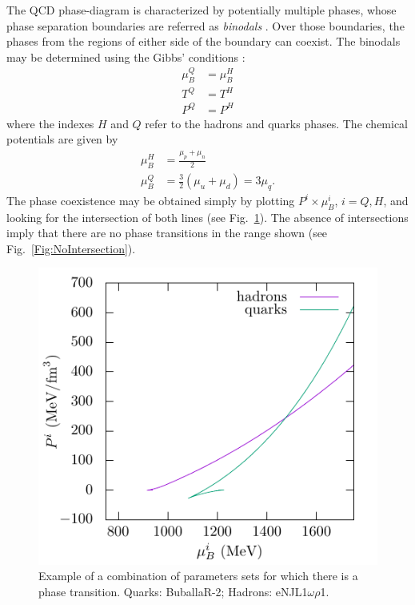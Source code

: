 \documentclass[prc, reprint, amsmath, floatfix,10pt]{revtex4-1}
\begin{document}
The QCD phase-diagram is characterized by potentially multiple phases, whose phase separation boundaries are referred as \emph{binodals} \cite{Mueller1995}. Over those boundaries, the phases from the regions of either side of the boundary can coexist. The binodals may be determined using the Gibbs' conditions \cite{Cavagnoli2011}:
\begin{align}
\mu_B^Q &= \mu_B^H \\
T^Q &= T^H \\
P^Q &= P^H
\end{align}
%
where the indexes $H$ and $Q$ refer to the hadrons and quarks phases. The chemical potentials are given by
\begin{align}
	\mu_B^H &= \frac{\mu_p + \mu_n}{2} \\
	\mu_B^Q &= \frac{3}{2} (\mu_u + \mu_d) = 3 \mu_q.
\end{align}
%
The phase coexistence may be obtained simply by plotting $P^i \times \mu_B^i$, $i = Q, H$, and looking for the intersection of both lines (see Fig.~\ref{Fig:Intersection}). The absence of intersections imply that there are no phase transitions in the range shown (see Fig.~\ref{Fig:NoIntersection}).

\begin{figure}
	\includegraphics[width=\linewidth]{graph/BuballaR_2-eNJL1OmegaRho1-quark-hadron_phase_transition.pdf}
	\caption{Example of a combination of parameters sets for which there is a phase transition. Quarks: BuballaR-2; Hadrons: eNJL1$\omega\rho$1. \label{Fig:Intersection}}
\end{figure}
\end{document}
